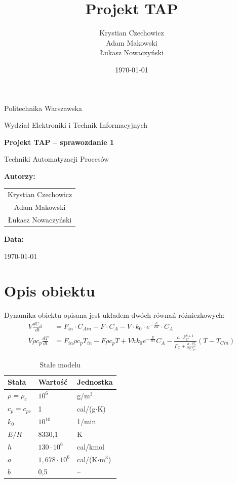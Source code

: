 \documentclass[a4paper,12pt]{article}
\title{\textbf{Projekt TAP}}
\author{
Krystian Czechowicz \\
Adam Makowski \\
Łukasz Nowaczyński
}
\date{\today}
\begin{document}
\begin{titlepage}
    \centering
    {\Large Politechnika Warszawska\par}
    \vspace{0.3cm}
    {\large Wydział Elektroniki i Technik Informacyjnych \par}
    \vspace{2cm}
    {\Huge \textbf{Projekt TAP -- sprawozdanie 1} \par}
    \vspace{0.5cm}
    {\Large Techniki Automatyzacji Procesów \par}
    \vspace{2cm}
    \textbf{Autorzy:} \par
    \vspace{0.5cm}
    \begin{tabular}{c}
        Krystian Czechowicz \\
        Adam Makowski \\
        Łukasz Nowaczyński
    \end{tabular}
    \vfill
    \vspace{1cm}
    \textbf{Data:} \par
    \today
\end{titlepage}

\tableofcontents
\newpage

\section{Opis obiektu}

Dynamika obiektu opisana jest układem dwóch równań różniczkowych:
\begin{align}
V \frac{dC_A}{dt} &= F_{in} \cdot C_{Ain} - F \cdot C_A - V \cdot k_0 \cdot e^{-\frac{E}{RT}} \cdot C_A \label{eq:ca}\\[6pt]
V \rho c_p \frac{dT}{dt} &= F_{in} \rho c_p T_{in} - F \rho c_p T + V h k_0 e^{-\frac{E}{RT}} C_A - \frac{a \cdot F_C^{b+1}}{F_C + \frac{a \cdot F_C^{b}}{2 \rho_c c_{pc}}} (T - T_{Cin}) \label{eq:T}
\end{align}

\begin{table}[H]
\centering
\begin{tabular}{lll}
\toprule
\textbf{Stała} & \textbf{Wartość} & \textbf{Jednostka} \\
\midrule
$\rho = \rho_c$ & $10^6$ & g/m$^3$ \\
$c_p = c_{pc}$ & 1 & cal/(g$\cdot$K) \\
$k_0$ & $10^{10}$ & 1/min \\
$E/R$ & 8330{,}1 & K \\
$h$ & $130 \cdot 10^6$ & cal/kmol \\
$a$ & $1{,}678 \cdot 10^6$ & cal/(K$\cdot$m$^3$) \\
$b$ & 0{,}5 & -- \\
\bottomrule
\end{tabular}
\caption{Stałe modelu}
\end{table}
\end{document}
